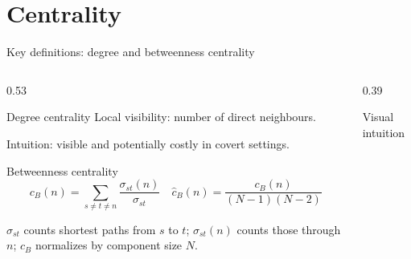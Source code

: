 \section{Centrality}

\begin{frame}{Key definitions: degree and betweenness centrality}
  \footnotesize
  \begin{columns}[T,onlytextwidth]
    \begin{column}{0.53\textwidth}
      \begin{block}{Degree centrality}
        Local visibility: number of direct neighbours.\par
        \vspace{0.35em}
        Intuition: visible and potentially costly in covert settings.
      \end{block}

      \begin{block}{Betweenness centrality}
        \vspace{-0.45em}
        {\setlength{\abovedisplayskip}{0.25em}%
        \setlength{\belowdisplayskip}{0.3em}%
        \[
        c_B(n)=\sum_{s\neq t\neq n}\frac{\sigma_{st}(n)}{\sigma_{st}}
        \quad
        \hat c_B(n)=\frac{c_B(n)}{(N-1)(N-2)}
        \]
        }

        {\scriptsize $\sigma_{st}$ counts shortest paths from $s$ to $t$;
        $\sigma_{st}(n)$ counts those through $n$;
        $\hat c_B$ normalizes by component size $N$.}
      \end{block}
    \end{column}

    \hfill

    \begin{column}{0.39\textwidth}
      \begin{block}{Visual intuition}
        \centering
\end{block}
\end{column}
\end{columns}
\end{frame}
